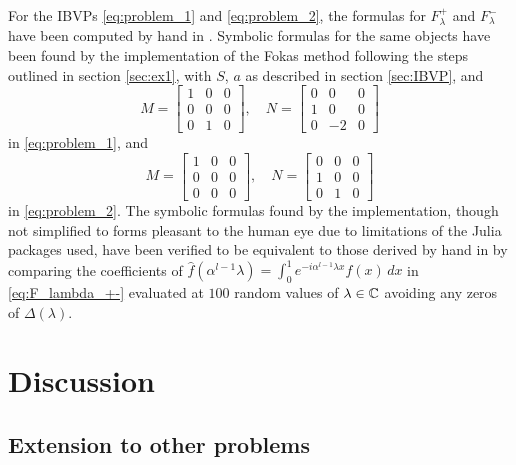 \documentclass[12pt, oneside, a4paper]{article}
\begin{document}
For the IBVPs \eqref{eq:problem_1} and \eqref{eq:problem_2}, the formulas for $F_\lambda^+$ and $F_\lambda^-$ have been computed by hand in \cite[p. 1-4]{Smith2016}. Symbolic formulas for the same objects have been found by the implementation of the Fokas method following the steps outlined in section \ref{sec:ex1}, with $S$, $a$ as described in section \ref{sec:IBVP}, and
\[M = \begin{bmatrix}1 & 0 & 0\\ 0 & 0 & 0\\ 0 & 1 & 0\end{bmatrix},\quad N = \begin{bmatrix} 0 & 0 & 0\\ 1 & 0 & 0 \\ 0 & -2 & 0\end{bmatrix}\]
in \eqref{eq:problem_1}, and 
\[M = \begin{bmatrix}1 & 0 & 0\\ 0 & 0 & 0\\ 0 & 0 & 0\end{bmatrix},\quad N = \begin{bmatrix} 0 & 0 & 0\\ 1 & 0 & 0 \\ 0 & 1 & 0\end{bmatrix}\]
in \eqref{eq:problem_2}. The symbolic formulas found by the implementation, though not simplified to forms pleasant to the human eye due to limitations of the Julia packages used, have been verified to be equivalent to those derived by hand in \cite{Smith2016} by comparing the coefficients of $\hat{f}(\alpha^{l-1}\lambda) = \int_0^1 e^{-i\alpha^{l-1}\lambda x}f(x)\,dx$ in \eqref{eq:F_lambda_+-} evaluated at $100$ random values of $\lambda\in\mathbb C$ avoiding any zeros of $\Delta(\lambda)$.

\section{Discussion}\label{sec:discussion}

\subsection{Extension to other problems}
\end{document}
